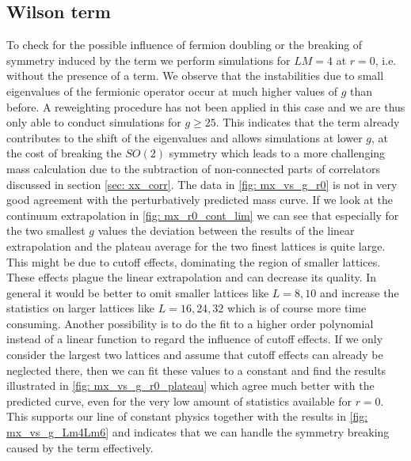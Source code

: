 \subsection*{Wilson term}
To check for the possible influence of fermion doubling or the breaking of symmetry induced by the  term we perform simulations for $LM=4$ at $r=0$, i.e. without the presence of a  term. We observe that the instabilities due to small eigenvalues of the fermionic operator occur at much higher values of $g$ than before. A reweighting procedure has not been applied in this case and we are thus only able to conduct simulations for $g \geq 25$. This indicates that the  term already contributes to the shift of the eigenvalues and allows simulations at lower $g$, at the cost of breaking the $SO(2)$ symmetry which leads to a more challenging mass calculation due to the subtraction of non-connected parts of correlators discussed in section \ref{sec: xx_corr}. The data in \autoref{fig: mx_vs_g_r0} is not in very good agreement with the perturbatively predicted mass curve. If we look at the continuum extrapolation in \autoref{fig: mx_r0_cont_lim} we can see that especially for the two smallest $g$ values the deviation between the results of the linear extrapolation and the plateau average for the two finest lattices is quite large. This might be due to cutoff effects, dominating the region of smaller lattices. These effects plague the linear extrapolation and can decrease its quality. In general it would be better to omit smaller lattices like $L=8,10$ and increase the statistics on larger lattices like $L=16,24,32$ which is of course more time consuming. Another possibility is to do the fit to a higher order polynomial instead of a linear function to regard the influence of cutoff effects. If we only consider the largest two lattices and assume that cutoff effects can already be neglected there, then we can fit these values to a constant and find the results illustrated in \autoref{fig: mx_vs_g_r0_plateau} which agree much better with the predicted curve, even for the very low amount of statistics available for $r=0$. This supports our line of constant physics together with the results in \autoref{fig: mx_vs_g_Lm4Lm6} and indicates that we can handle the symmetry breaking caused by the  term effectively.
%
%
